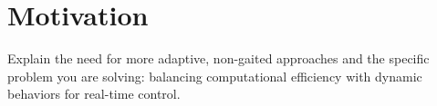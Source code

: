 \section{Motivation}

\begin{outline}
  Explain the need for more adaptive, non-gaited approaches and the
  specific problem you are solving: balancing computational
  efficiency with dynamic behaviors for real-time control.
\end{outline}
